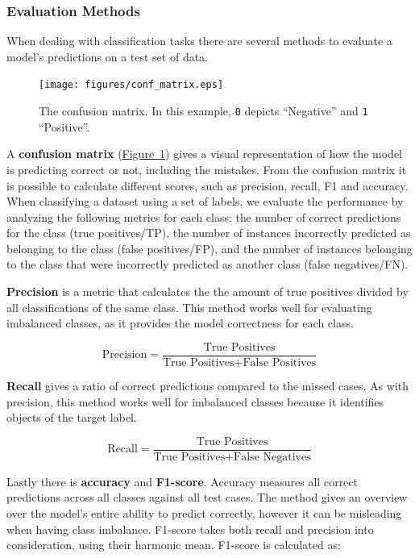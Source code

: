 \documentclass{article}
\begin{document}
\begin{multicols}{2}
\subsubsection*{Evaluation Methods}
When dealing with classification tasks there are several methods to evaluate a model's predictions on a test set of data. 

\begin{figure}[H]
    \centering
    \texttt{[image: figures/conf\_matrix.eps]} 
    \caption{The confusion matrix. In this example, \texttt{0} depicts ``Negative'' and \texttt{1} ``Positive''.}
    \label{fig:conf_mat_general}
\end{figure}

A \textbf{confusion matrix} (\hyperref[fig:conf_mat_general]{Figure~\ref*{fig:conf_mat_general}}) gives a visual representation of how the model is predicting correct or not, including the mistakes. From the confusion matrix it is possible to calculate different scores, such as precision, recall, F1 and accuracy. When classifying a dataset using a set of labels, we evaluate the performance by analyzing the following metrics for each class: the number of correct predictions for the class (true positives/TP), the number of instances incorrectly predicted as belonging to the class (false positives/FP), and the number of instances belonging to the class that were incorrectly predicted as another class (false negatives/FN).

\textbf{Precision} is a metric that calculates the the amount of true positives divided by all classifications of the same class. This method works well for evaluating imbalanced classes, as it provides the model correctness for each class. 

$$ \text{Precision} = \frac{\text{True Positives}}{\text{True Positives}+\text{False Positives}} $$

\textbf{Recall} gives a ratio of correct predictions compared to the missed cases. As with precision, this method works well for imbalanced classes because it identifies objects of the target label. 

$$ \text{Recall} = \frac{\text{True Positives}}{\text{True Positives}+\text{False Negatives}} $$

Lastly there is \textbf{accuracy} and \textbf{F1-score}. Accuracy measures all correct predictions across all classes against all test cases. The method gives an overview over the model's entire ability to predict correctly, however it can be misleading when having class imbalance. F1-score takes both recall and precision into consideration, using their harmonic mean. F1-score is calculated as:


\end{multicols}
\end{document}
